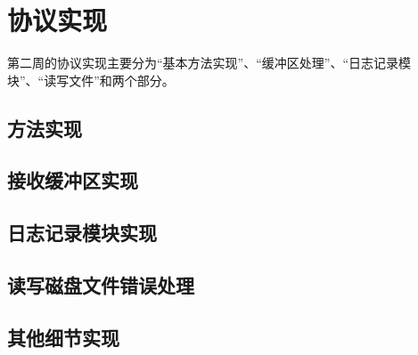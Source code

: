 
\chapter{协议实现}

第二周的协议实现主要分为“基本方法实现”、“缓冲区处理”、“日志记录模块”、“读写文件”和两个部分。

\section{方法实现}


\section{接收缓冲区实现}

\section{日志记录模块实现}

\section{读写磁盘文件错误处理}

\section{其他细节实现}



